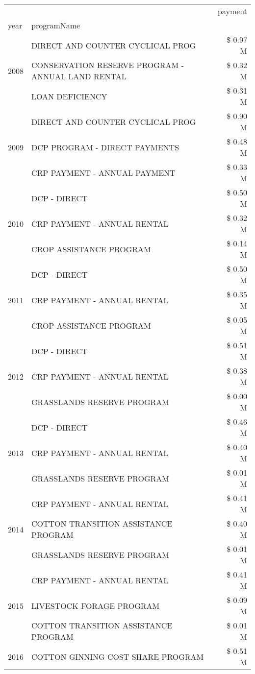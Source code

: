 \begin{tabular}{llr}
\toprule
 &  & payment \\
year & programName &  \\
\midrule
\multirow[t]{3}{*}{2008} & DIRECT AND COUNTER CYCLICAL PROG & \$ 0.97 M \\
 & CONSERVATION RESERVE PROGRAM - ANNUAL LAND RENTAL & \$ 0.32 M \\
 & LOAN DEFICIENCY & \$ 0.31 M \\
\cline{1-3}
\multirow[t]{3}{*}{2009} & DIRECT AND COUNTER CYCLICAL PROG & \$ 0.90 M \\
 & DCP PROGRAM - DIRECT PAYMENTS & \$ 0.48 M \\
 & CRP PAYMENT - ANNUAL PAYMENT & \$ 0.33 M \\
\cline{1-3}
\multirow[t]{3}{*}{2010} & DCP - DIRECT & \$ 0.50 M \\
 & CRP PAYMENT - ANNUAL RENTAL & \$ 0.32 M \\
 & CROP ASSISTANCE PROGRAM & \$ 0.14 M \\
\cline{1-3}
\multirow[t]{3}{*}{2011} & DCP - DIRECT & \$ 0.50 M \\
 & CRP PAYMENT - ANNUAL RENTAL & \$ 0.35 M \\
 & CROP ASSISTANCE PROGRAM & \$ 0.05 M \\
\cline{1-3}
\multirow[t]{3}{*}{2012} & DCP - DIRECT & \$ 0.51 M \\
 & CRP PAYMENT - ANNUAL RENTAL & \$ 0.38 M \\
 & GRASSLANDS RESERVE PROGRAM & \$ 0.00 M \\
\cline{1-3}
\multirow[t]{3}{*}{2013} & DCP - DIRECT & \$ 0.46 M \\
 & CRP PAYMENT - ANNUAL RENTAL & \$ 0.40 M \\
 & GRASSLANDS RESERVE PROGRAM & \$ 0.01 M \\
\cline{1-3}
\multirow[t]{3}{*}{2014} & CRP PAYMENT - ANNUAL RENTAL & \$ 0.41 M \\
 & COTTON TRANSITION ASSISTANCE PROGRAM & \$ 0.40 M \\
 & GRASSLANDS RESERVE PROGRAM & \$ 0.01 M \\
\cline{1-3}
\multirow[t]{3}{*}{2015} & CRP PAYMENT - ANNUAL RENTAL & \$ 0.41 M \\
 & LIVESTOCK FORAGE PROGRAM & \$ 0.09 M \\
 & COTTON TRANSITION ASSISTANCE PROGRAM & \$ 0.01 M \\
\cline{1-3}
\multirow[t]{3}{*}{2016} & COTTON GINNING COST SHARE PROGRAM & \$ 0.51 M \\

\end{tabular}
